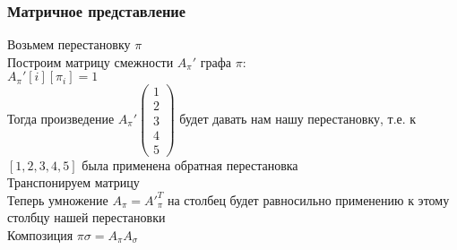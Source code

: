 \documentclass[12pt]{article}
\begin{document}
\subsubsection{Матричное представление}
Возьмем перестановку $\pi$\\
Построим матрицу смежности $A_\pi'$ графа $\pi$:\\
$A_\pi'[i][\pi_i] = 1$\\
Тогда произведение $A_\pi'\begin{pmatrix}1\\2\\3\\4\\5\end{pmatrix}$ будет давать нам нашу перестановку, т.е. к $[1, 2, 3, 4, 5]$ была применена обратная перестановка\\
Транспонируем матрицу\\
Теперь умножение $A_\pi = A'^T_\pi$ на столбец будет равносильно применению к этому столбцу нашей перестановки\\
Композиция $\pi\sigma = A_\pi A_\sigma$
\end{document}
